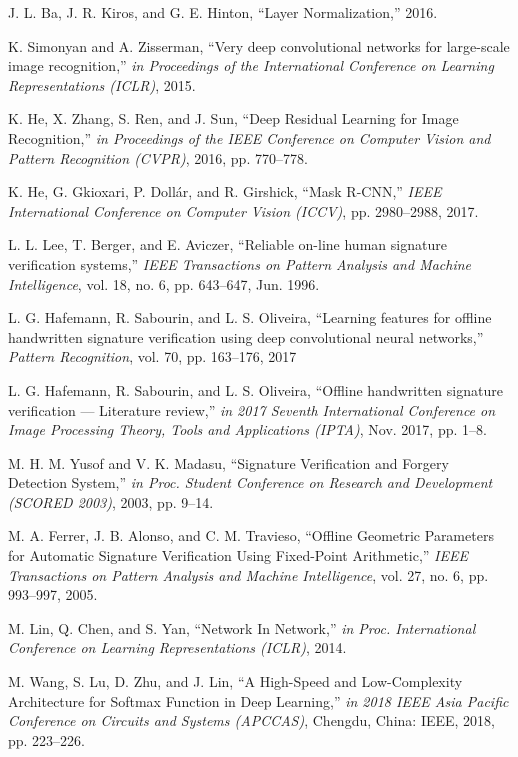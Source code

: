 \begin{thebibliography}{10}
J. L. Ba, J. R. Kiros, and G. E. Hinton, ``Layer Normalization,''
2016.

K. Simonyan and A. Zisserman, ``Very deep convolutional networks for large-scale image recognition,'' {\em in Proceedings of the International Conference on Learning Representations (ICLR)},
2015.

K. He, X. Zhang, S. Ren, and J. Sun, ``Deep Residual Learning for Image Recognition,'' {\em in Proceedings of the IEEE Conference on Computer Vision and Pattern Recognition (CVPR)},
2016, pp. 770--778.

K. He, G. Gkioxari, P. Dollár, and R. Girshick, ``Mask R-CNN,'' {\em IEEE International Conference on Computer Vision (ICCV)}, pp. 2980--2988,
2017.

L. L. Lee, T. Berger, and E. Aviczer, ``Reliable on-line human signature verification systems,'' {\em IEEE Transactions on Pattern Analysis and Machine Intelligence}, vol. 18, no. 6, pp. 643--647,
Jun. 1996.

L. G. Hafemann, R. Sabourin, and L. S. Oliveira, ``Learning features for offline handwritten signature verification using deep convolutional neural networks,'' {\em Pattern Recognition}, vol. 70, pp. 163--176,
2017

L. G. Hafemann, R. Sabourin, and L. S. Oliveira, ``Offline handwritten signature verification — Literature review,'' {\em in 2017 Seventh International Conference on Image Processing Theory, Tools and Applications (IPTA)},
Nov. 2017, pp. 1--8.

M. H. M. Yusof and V. K. Madasu, ``Signature Verification and Forgery Detection System,'' {\em in Proc. Student Conference on Research and Development (SCORED 2003)},
2003, pp. 9--14.

M. A. Ferrer, J. B. Alonso, and C. M. Travieso, ``Offline Geometric Parameters for Automatic Signature Verification Using Fixed-Point Arithmetic,'' {\em IEEE Transactions on Pattern Analysis and Machine Intelligence}, vol. 27, no. 6, pp. 993--997,
2005.

M. Lin, Q. Chen, and S. Yan, ``Network In Network,'' {\em in Proc. International Conference on Learning Representations (ICLR)},
2014.

M. Wang, S. Lu, D. Zhu, and J. Lin, ``A High-Speed and Low-Complexity Architecture for Softmax Function in Deep Learning,'' {\em in 2018 IEEE Asia Pacific Conference on Circuits and Systems (APCCAS)}, Chengdu, China: IEEE,
2018, pp. 223--226.


\end{thebibliography}
